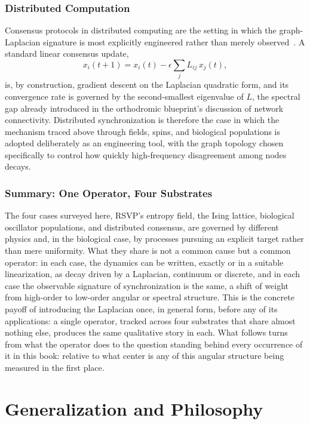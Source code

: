 \documentclass[11pt,fleqn]{book}
\numberwithin{equation}{chapter}
\theoremstyle{plain}
\theoremstyle{definition}
\theoremstyle{remark}
\begin{document}
\section{Distributed Computation}

Consensus protocols in distributed computing are the setting in which the graph-Laplacian signature is most explicitly engineered rather than merely observed~\cite{olfatisaber2004}. A standard linear consensus update,
\begin{equation}
x_i(t+1) = x_i(t) - \epsilon \sum_{j} L_{ij}\, x_j(t),
\end{equation}
is, by construction, gradient descent on the Laplacian quadratic form, and its convergence rate is governed by the second-smallest eigenvalue of \(L\), the spectral gap already introduced in the orthodromic blueprint's discussion of network connectivity. Distributed synchronization is therefore the case in which the mechanism traced above through fields, spins, and biological populations is adopted deliberately as an engineering tool, with the graph topology chosen specifically to control how quickly high-frequency disagreement among nodes decays.

\section{Summary: One Operator, Four Substrates}

The four cases surveyed here, RSVP's entropy field, the Ising lattice, biological oscillator populations, and distributed consensus, are governed by different physics and, in the biological case, by processes pursuing an explicit target rather than mere uniformity. What they share is not a common cause but a common operator: in each case, the dynamics can be written, exactly or in a suitable linearization, as decay driven by a Laplacian, continuum or discrete, and in each case the observable signature of synchronization is the same, a shift of weight from high-order to low-order angular or spectral structure. This is the concrete payoff of introducing the Laplacian once, in general form, before any of its applications: a single operator, tracked across four substrates that share almost nothing else, produces the same qualitative story in each. What follows turns from what the operator does to the question standing behind every occurrence of it in this book: relative to what center is any of this angular structure being measured in the first place.


\part{Generalization and Philosophy}
\end{document}

